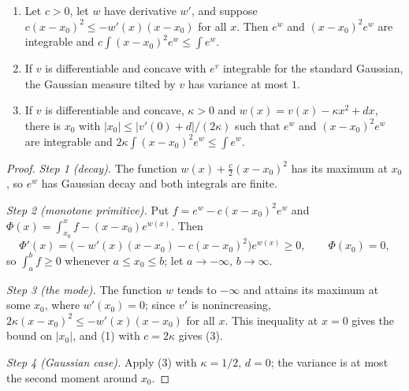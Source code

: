 \begin{lemma}\label{lem:sg-tal:st-mode-variance}
  \leanok
{}
\begin{enumerate}
\item Let $c>0$, let $w$ have derivative $w'$, and suppose $c(x-x_0)^2\le-w'(x)(x-x_0)$ for all $x$. Then
$e^{w}$ and $(x-x_0)^2e^{w}$ are integrable and $c\int(x-x_0)^2e^{w}\le\int e^{w}$.
\item If $v$ is differentiable and concave with $e^{v}$ integrable for the standard Gaussian, the Gaussian
measure tilted by $v$ has variance at most $1$.
\item If $v$ is differentiable and concave, $\kappa>0$ and $w(x)=v(x)-\kappa x^2+dx$, there is $x_0$ with
$|x_0|\le|v'(0)+d|/(2\kappa)$ such that $e^{w}$ and $(x-x_0)^2e^{w}$ are integrable and
$2\kappa\int(x-x_0)^2e^{w}\le\int e^{w}$.
\end{enumerate}
\end{lemma}
\begin{proof}
  \leanok
\emph{Step 1 (decay).} The function $w(x)+\frac c2(x-x_0)^2$ has its maximum at $x_0$, so $e^w$ has Gaussian
decay and both integrals are finite.

\emph{Step 2 (monotone primitive).} Put $f=e^w-c(x-x_0)^2e^w$ and
$\Phi(x)=\int_{x_0}^xf-(x-x_0)e^{w(x)}$. Then
\[
\Phi'(x)=\bigl(-w'(x)(x-x_0)-c(x-x_0)^2\bigr)e^{w(x)}\ge0,\qquad\Phi(x_0)=0,
\]
so $\int_a^bf\ge0$ whenever $a\le x_0\le b$; let $a\to-\infty$, $b\to\infty$.

\emph{Step 3 (the mode).} The function $w$ tends to $-\infty$ and attains its maximum at some $x_0$, where
$w'(x_0)=0$; since $v'$ is nonincreasing, $2\kappa(x-x_0)^2\le-w'(x)(x-x_0)$ for all $x$. This inequality at
$x=0$ gives the bound on $|x_0|$, and (1) with $c=2\kappa$ gives (3).

\emph{Step 4 (Gaussian case).} Apply (3) with $\kappa=1/2$, $d=0$; the variance is at most the second moment
around $x_0$.
\end{proof}

